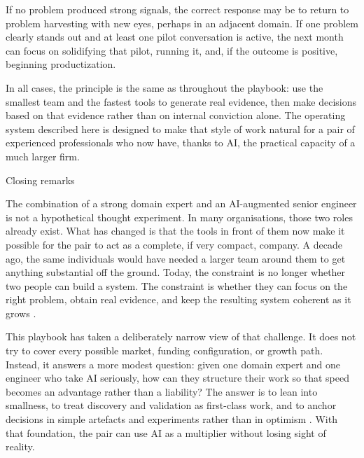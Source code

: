 \documentclass[10pt, a4paper, twocolumn]{article} %
\makeatletter
\let\orig@section\section %
\renewcommand{\section}{%
  \@ifstar{\orig@section*}{\unnumberedsteppingsection}%
}
\newcommand{\unnumberedsteppingsection}[1]{%
  \refstepcounter{section}%
  \orig@section*{#1}%
}
\makeatother
\begin{document}
If no problem produced strong signals, the correct response may be to return to problem harvesting with new eyes, perhaps in an adjacent domain. If one problem clearly stands out and at least one pilot conversation is active, the next month can focus on solidifying that pilot, running it, and, if the outcome is positive, beginning productization.

In all cases, the principle is the same as throughout the playbook: use the smallest team and the fastest tools to generate real evidence, then make decisions based on that evidence rather than on internal conviction alone. The operating system described here is designed to make that style of work natural for a pair of experienced professionals who now have, thanks to AI, the practical capacity of a much larger firm.


\newpage

\section{Closing remarks}

The combination of a strong domain expert and an AI-augmented senior engineer is not a hypothetical thought experiment. In many organisations, those two roles already exist. What has changed is that the tools in front of them now make it possible for the pair to act as a complete, if very compact, company. A decade ago, the same individuals would have needed a larger team around them to get anything substantial off the ground. Today, the constraint is no longer whether two people can build a system. The constraint is whether they can focus on the right problem, obtain real evidence, and keep the resulting system coherent as it grows \citep{forsgren2018accelerate,blomgren2025coordination}.

This playbook has taken a deliberately narrow view of that challenge. It does not try to cover every possible market, funding configuration, or growth path. Instead, it answers a more modest question: given one domain expert and one engineer who take AI seriously, how can they structure their work so that speed becomes an advantage rather than a liability? The answer is to lean into smallness, to treat discovery and validation as first-class work, and to anchor decisions in simple artefacts and experiments rather than in optimism \citep{ries2011lean,bland2019testing,fitzpatrick2013mom}. With that foundation, the pair can use AI as a multiplier without losing sight of reality.
\end{document}

